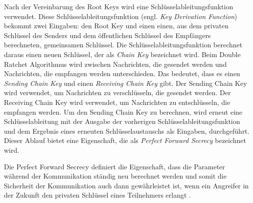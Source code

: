 \noindent Nach der Vereinbarung des Root Keys wird eine Schlüsselableitungsfunktion verwendet. Diese Schlüsselableitungsfunktion (engl. \textit{Key Derivation Function}) bekommt zwei Eingaben: den Root Key und einen einen, aus dem privaten Schlüssel des Senders und dem öffentlichen Schlüssel des Empfängers berechneten, gemeinsamen Schlüssel. Die Schlüsselableitungsfunktion berechnet daraus einen neuen Schlüssel, der als \textit{Chain Key} bezeichnet wird. Beim Double Ratchet Algorithmus wird zwischen Nachrichten, die gesendet werden und Nachrichten, die empfangen werden unterschieden. Das bedeutet, dass es einen \textit{Sending Chain Key} und einen \textit{Receiving Chain Key} gibt. Der Sending Chain Key wird verwendet, um Nachrichten zu verschlüsseln, die gesendet werden. Der Receiving Chain Key wird verwendet, um Nachrichten zu entschlüsseln, die empfangen werden. Um den Sending Chain Key zu berechnen, wird erneut eine Schlüsselableitung mit der Ausgabe der vorherigen Schlüsselableitungsfunktion und dem Ergebnis eines erneuten Schlüsselaustauschs als Eingaben, durchgeführt. Dieser Ablauf bietet eine Eigenschaft, die als \textit{Perfect Forward Secrecy} bezeichnet wird.

Die Perfect Forward Secrecy definiert die Eigenschaft, dass die Parameter während der Kommunikation ständig neu berechnet werden und somit die Sicherheit der Kommunikation auch dann gewährleistet ist, wenn ein Angreifer in der Zukunft den privaten Schlüssel eines Teilnehmers erlangt \parencite{ElektronikKompendium_PFS}.
